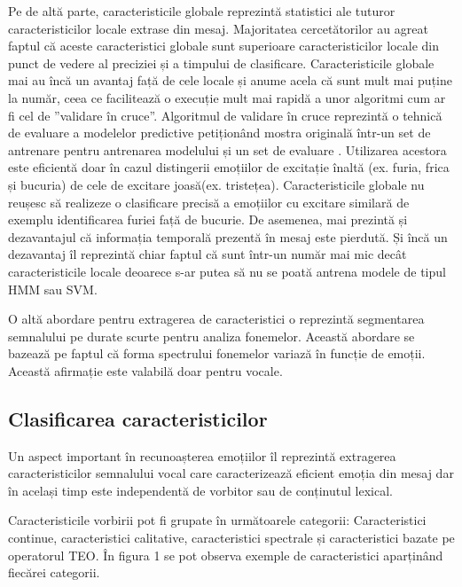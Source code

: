 \documentclass[9pt,shortpaper,twoside,web]{ieeecolor}
\begin{document}
Pe de altă parte, caracteristicile globale reprezintă statistici ale tuturor caracteristicilor locale extrase din mesaj. Majoritatea cercetătorilor au agreat faptul că aceste caracteristici globale sunt superioare caracteristicilor locale din punct de vedere al preciziei și a timpului de clasificare. Caracteristicile globale mai au încă un avantaj față de cele locale și anume acela că sunt mult mai puține la număr, ceea ce facilitează o execuție mult mai rapidă a unor algoritmi cum ar fi cel de ”validare în cruce”. Algoritmul de validare în cruce reprezintă o tehnică de evaluare a modelelor predictive petiționând mostra originală într-un set de antrenare pentru antrenarea modelului și un set de evaluare \cite{b2}. Utilizarea acestora este eficientă doar în cazul distingerii emoțiilor de excitație înaltă (ex. furia, frica și bucuria) de cele de excitare joasă(ex. tristețea). Caracteristicile globale nu reușesc să realizeze o clasificare precisă a emoțiilor cu excitare similară de exemplu identificarea furiei față de bucurie. De asemenea, mai prezintă și dezavantajul că informația temporală prezentă în mesaj este pierdută. Și încă un dezavantaj îl reprezintă chiar faptul că sunt într-un număr mai mic decât caracteristicile locale deoarece s-ar putea să nu se poată antrena modele de tipul HMM sau SVM.

O altă abordare pentru extragerea de caracteristici o reprezintă segmentarea semnalului pe durate scurte pentru analiza fonemelor. Această abordare se bazează pe faptul că forma spectrului fonemelor variază în funcție de emoții. Această afirmație este valabilă doar pentru vocale.


\subsection{Clasificarea caracteristicilor}
Un aspect important în recunoașterea emoțiilor îl reprezintă extragerea caracteristicilor semnalului vocal care caracterizează eficient emoția din mesaj dar în același timp este independentă de vorbitor sau de conținutul lexical.

Caracteristicile vorbirii pot fi grupate în următoarele categorii: Caracteristici continue, caracteristici calitative, caracteristici spectrale și caracteristici bazate pe operatorul TEO. În figura 1 se pot observa exemple de caracteristici aparținând fiecărei categorii.
\end{document}
